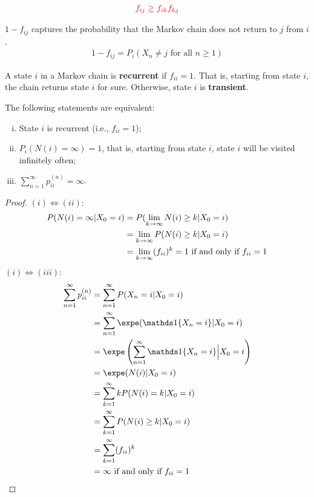 \documentclass{article}
\begin{document}
	\begin{corollary}
		\begin{align}
			\textcolor{red}{f_{ij} \geq f_{ik}f_{kj}}
		\end{align}
	\end{corollary}
    
    \begin{proposition}
    	$1-f_{i j}$ captures the probability that the Markov chain does not return to $j$ from $i$.
    	\begin{align}
    		1-f_{i j}=P_{i}\left(X_{n} \neq j \text { for all } n \geq 1\right)
    	\end{align}
    \end{proposition}
    
    \begin{definition}
    	A state $i$ in a Markov chain is \textbf{recurrent} if $f_{ii} = 1$. That is, starting from state $i$, the chain returns state $i$ for sure.
    	Otherwise, state $i$ is \textbf{transient}.
    \end{definition}
    
    \begin{theorem}
    	The following statements are equivalent:
    	\begin{enumerate}[(i)]
    		\item State $i$ is recurrent (i.e., $f_{ii}=1$);
    		\item $P_i(N(i) = \infty) = 1$, that is, starting from state $i$, state $i$ will be visited infinitely often;
    		\item $\sum_{n=1}^\infty p_{ii}^{(n)} = \infty$.
    	\end{enumerate}
    \end{theorem}

    \begin{proof}
    	$(i) \iff (ii)$:
    	\begin{align}
    		P(N(i) = \infty|X_0=i) &= P(\lim_{k \to \infty} N(i) \geq k| X_0=i) \\
    		&= \lim_{k \to \infty} P(N(i) \geq k| X_0=i) \\
    		&= \lim_{k \to \infty} (f_{ii})^k = 1 \text{{ if and only if }} f_{ii} = 1
    	\end{align}
    	$(i) \iff (iii)$:
    	\begin{align}
    		\sum_{n=1}^\infty p_{ii}^{(n)}
    		&= \sum_{n=1}^\infty P(X_n = i | X_0 = i) \\
    		&= \sum_{n=1}^\infty \expe (\id{X_n=i} | X_0 = i) \\
    		&= \expe \left(
    		\sum_{n=1}^\infty \id{X_n=i} \Big| X_0 = i
    		\right ) \\
    		&= \expe (N(i) | X_0=i) \\
    		&= \sum_{k=1}^\infty k P(N(i)=k | X_0=i) \\
    		&= \sum_{k=1}^\infty P(N(i) \geq k | X_0=i) \\
    		&= \sum_{k=1}^\infty (f_{ii})^k \\
    		&= \infty \tx{ if and only if } f_{ii} = 1
    	\end{align}
    \end{proof}
 
\end{document}

